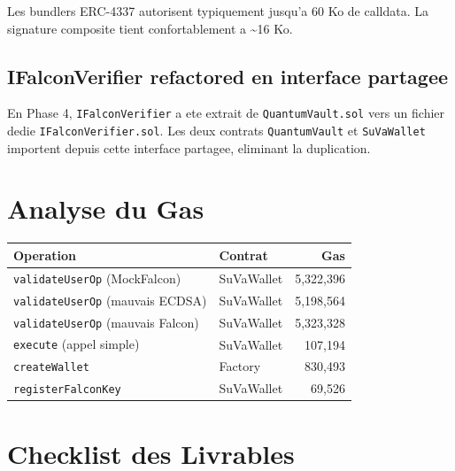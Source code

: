 \documentclass[11pt,a4paper]{article}
\begin{document}
Les bundlers ERC-4337 autorisent typiquement jusqu'a 60 Ko de calldata. La signature
composite tient confortablement a \textasciitilde 16 Ko.

\subsection{IFalconVerifier refactored en interface partagee}

En Phase 4, \texttt{IFalconVerifier} a ete extrait de \texttt{QuantumVault.sol} vers un fichier
dedie \texttt{IFalconVerifier.sol}. Les deux contrats \texttt{QuantumVault} et \texttt{SuVaWallet}
importent depuis cette interface partagee, eliminant la duplication.

\section{Analyse du Gas}

\begin{center}
\begin{tabular}{llr}
\toprule
\textbf{Operation} & \textbf{Contrat} & \textbf{Gas} \\
\midrule
\texttt{validateUserOp} (MockFalcon)   & SuVaWallet & 5,322,396 \\
\texttt{validateUserOp} (mauvais ECDSA)& SuVaWallet & 5,198,564 \\
\texttt{validateUserOp} (mauvais Falcon)& SuVaWallet & 5,323,328 \\
\texttt{execute} (appel simple)        & SuVaWallet &   107,194 \\
\texttt{createWallet}                  & Factory    &   830,493 \\
\texttt{registerFalconKey}             & SuVaWallet &    69,526 \\
\bottomrule
\end{tabular}
\end{center}

\section{Checklist des Livrables}
\end{document}
